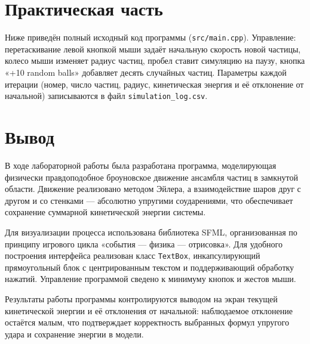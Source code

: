 \documentclass[a4paper]{article}
\newcommand{\mainsection}[1]{%
    \phantomsection
    \section*{\centering\fontsize{16pt}{0pt}\selectfont\textbf{#1}}%
}
\begin{document}
\newpage

\mainsection{Практическая часть}
\label{sec:practice}

Ниже приведён полный исходный код программы (\texttt{src/main.cpp}). Управление: перетаскивание левой кнопкой мыши задаёт начальную скорость новой частицы, колесо мыши изменяет радиус частиц, пробел ставит симуляцию на паузу, кнопка «+10 random balls» добавляет десять случайных частиц. Параметры каждой итерации (номер, число частиц, радиус, кинетическая энергия и её отклонение от начальной) записываются в файл \texttt{simulation\_log.csv}.



\newpage

\mainsection{Вывод}
\label{sec:conclusion}

В ходе лабораторной работы была разработана программа, моделирующая физически правдоподобное броуновское движение ансамбля частиц в замкнутой области. Движение реализовано методом Эйлера, а взаимодействие шаров друг с другом и со стенками --- абсолютно упругими соударениями, что обеспечивает сохранение суммарной кинетической энергии системы.

Для визуализации процесса использована библиотека SFML, организованная по принципу игрового цикла «события --- физика --- отрисовка». Для удобного построения интерфейса реализован класс \texttt{TextBox}, инкапсулирующий прямоугольный блок с центрированным текстом и поддерживающий обработку нажатий. Управление программой сведено к минимуму кнопок и жестов мыши.

Результаты работы программы контролируются выводом на экран текущей кинетической энергии и её отклонения от начальной: наблюдаемое отклонение остаётся малым, что подтверждает корректность выбранных формул упругого удара и сохранение энергии в модели.
\end{document}
